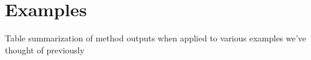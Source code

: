 \section{Examples}
\label{sec:gc:examples}

Table summarization of method outputs when applied to various examples we've 
thought of previously